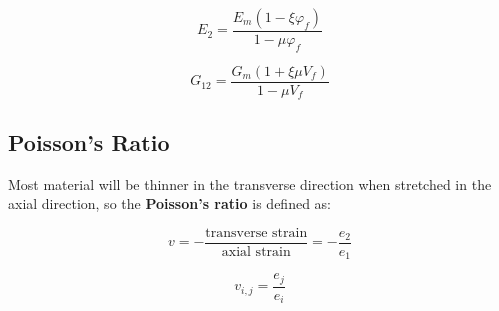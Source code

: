 \documentclass{NoteThesis/note-thesis}
\begin{document}
\begin{equation*}
    E_2 = \frac{E_m(1-\xi \varphi_f)}{1-\mu \varphi_f}
\end{equation*}

\begin{equation*}
    G_{12} = \frac{G_m (1+\xi \mu V_f)}{1-\mu V_f}
\end{equation*}

\subsection{Poisson's Ratio}

Most material will be thinner in the transverse direction when stretched in the axial direction, so the \textbf{Poisson's ratio} is defined as:

\begin{equation*}
    v = - \frac{\text{transverse strain}}{\text{axial strain}} = - \frac{e_2}{e_1}
\end{equation*}

\begin{equation*}
    v_{i,j} = \frac{e_j}{e_i}
\end{equation*}
\end{document}
